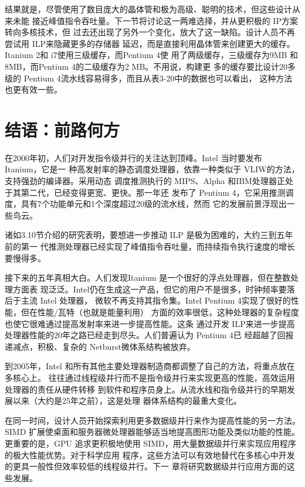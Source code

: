 结果就是，尽管使用了数目庞大的晶体管和极为高级、聪明的技术，但这些设计从来未能
接近峰值指令吞吐量。下一节将讨论这一两难选择，并从更积极的 IP方案转向多核技术，但
过去还出现了另外一个变化，放大了这一缺陷。设计人员不再尝试用 ILP来隐藏更多的存储器
延迟，而是直接利用晶体管来创建更大的缓存。Itanium 2和 i7使用三级缓存，而Pentium 4使
用了两级缓存，三级缓存为9MB 和 8MB，而Pentium 4的二级缓存为2 MB。不用说，构建更
多的缓存要比设计20多级的 Pentium 4流水线容易得多，而且从表3-20中的数据也可以看出，
这种方法也更有效一些。
\section{结语：前路何方}
在2000年初，人们对开发指令级并行的关注达到顶峰。Intel 当时要发布 Itanium，它是一
种高发射率的静态调度处理器，依靠一种类似于 VLIW的方法，支持强劲的编译器。采用动态
调度推测执行的 MIPS、Alpha 和IBM处理器正处于其第二代，已经变得更宽、更快。那一年还
发布了 Pentium 4，它采用推测调度，具有7个功能单元和1个深度超过20级的流水线，然而
它的发展前景浮现出一些鸟云。

诸如3.10节介绍的研究表明，要想进一步推动 ILP 是极为困难的，大约三到五年前的第一
代推测处理器已经实现了峰值指令吞吐量，而持续指令执行速度的增长要慢得多。

接下来的五年真相大白。人们发现Itanium 是一个很好的浮点处理器，但在整数处理方面表
现泛泛。Intel仍在生成这一产品，但它的用户不是很多，时钟频率要落后于主流 Intel 处理器，
微软不再支持其指令集。Intel Pentium 4实现了很好的性能，但在性能/瓦特（也就是能量利用）
方面的效率很低，这种处理器的复杂程度也使它很难通过提高发射率来进一步提高性能。这条
通过开发 ILP来进一步提高处理器性能的20年之路已经走到尽头。人们普遍认为 Pentium 4已
经超越了回报递减点，积极、复杂的 Netburst微体系结构被放弃。

到2005年，Intel 和所有其他主要处理器制造商都调整了自己的方法，将重点放在多核心上。
往往通过线程级并行而不是指令级并行来实现更高的性能，高效运用处理器的责任从硬件转移
到软件和程序员身上。从流水线和指令级并行的早期发展以来（大约是25年之前），这是处理
器体系结构的最重大变化。

在同一时间，设计人员开始探索利用更多数据级并行来作为提高性能的另一方法。SIMD
扩展使桌面和服务器微处理器能够适当地提高图形功能及类似功能的性能。更重要的是，GPU
追求更积极地使用 SIMD，用大量数据级并行来实现应用程序的极大性能优势。对于科学应用
程序，这些方法可以有效地替代在多核心中开发的更具一般性但效率较低的线程级并行。下一
章将研究数据级并行应用方面的这些发展。

